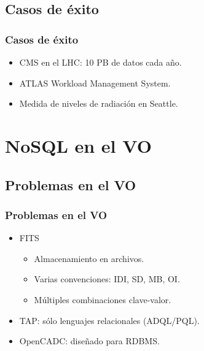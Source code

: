 \documentclass[serif,12pt]{beamer}
\begin{document}
\subsection{Casos de éxito}
\begin{frame}
\frametitle{Casos de éxito}

\begin{itemize}
\item CMS en el LHC: 10 PB de datos cada año.
\item ATLAS Workload Management System.
\item Medida de niveles de radiación en Seattle.
\end{itemize}


\end{frame}





\section{NoSQL en el VO}


\subsection{Problemas en el VO}
\begin{frame}
\frametitle{Problemas en el VO}

\begin{itemize}
\item FITS
  \begin{itemize}
    \item Almacenamiento en archivos.
    \item Varias convenciones: IDI, SD, MB, OI.
    \item Múltiples combinaciones clave-valor.
  \end{itemize}
\item TAP: sólo lenguajes relacionales (ADQL/PQL).
\item OpenCADC: diseñado para RDBMS.
\end{itemize}

\end{frame}



\end{document}
